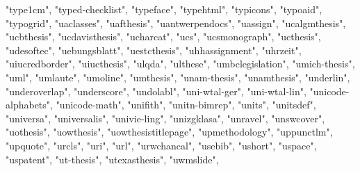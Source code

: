 \documentclass[
]{article}
\newenvironment{Shaded}{\begin{snugshade}}{\end{snugshade}}
\newcommand{\NormalTok}[1]{#1}
\newcommand{\StringTok}[1]{\textcolor[rgb]{0.31,0.60,0.02}{#1}}
\begin{document}
\begin{Shaded}
\begin{Highlighting}[]
\StringTok{"type1cm"}\NormalTok{, }\StringTok{"typed{-}checklist"}\NormalTok{, }\StringTok{"typeface"}\NormalTok{, }\StringTok{"typehtml"}\NormalTok{, }\StringTok{"typicons"}\NormalTok{, }
\StringTok{"typoaid"}\NormalTok{, }\StringTok{"typogrid"}\NormalTok{, }\StringTok{"uaclasses"}\NormalTok{, }\StringTok{"uafthesis"}\NormalTok{, }\StringTok{"uantwerpendocs"}\NormalTok{, }
\StringTok{"uassign"}\NormalTok{, }\StringTok{"ucalgmthesis"}\NormalTok{, }\StringTok{"ucbthesis"}\NormalTok{, }\StringTok{"ucdavisthesis"}\NormalTok{, }\StringTok{"ucharcat"}\NormalTok{, }
\StringTok{"ucs"}\NormalTok{, }\StringTok{"ucsmonograph"}\NormalTok{, }\StringTok{"ucthesis"}\NormalTok{, }\StringTok{"udesoftec"}\NormalTok{, }\StringTok{"uebungsblatt"}\NormalTok{, }
\StringTok{"uestcthesis"}\NormalTok{, }\StringTok{"uhhassignment"}\NormalTok{, }\StringTok{"uhrzeit"}\NormalTok{, }\StringTok{"uiucredborder"}\NormalTok{, }\StringTok{"uiucthesis"}\NormalTok{, }
\StringTok{"ulqda"}\NormalTok{, }\StringTok{"ulthese"}\NormalTok{, }\StringTok{"umbclegislation"}\NormalTok{, }\StringTok{"umich{-}thesis"}\NormalTok{, }\StringTok{"uml"}\NormalTok{, }
\StringTok{"umlaute"}\NormalTok{, }\StringTok{"umoline"}\NormalTok{, }\StringTok{"umthesis"}\NormalTok{, }\StringTok{"unam{-}thesis"}\NormalTok{, }\StringTok{"unamthesis"}\NormalTok{, }
\StringTok{"underlin"}\NormalTok{, }\StringTok{"underoverlap"}\NormalTok{, }\StringTok{"underscore"}\NormalTok{, }\StringTok{"undolabl"}\NormalTok{, }\StringTok{"uni{-}wtal{-}ger"}\NormalTok{, }
\StringTok{"uni{-}wtal{-}lin"}\NormalTok{, }\StringTok{"unicode{-}alphabets"}\NormalTok{, }\StringTok{"unicode{-}math"}\NormalTok{, }\StringTok{"unifith"}\NormalTok{, }
\StringTok{"unitn{-}bimrep"}\NormalTok{, }\StringTok{"units"}\NormalTok{, }\StringTok{"unitsdef"}\NormalTok{, }\StringTok{"universa"}\NormalTok{, }\StringTok{"universalis"}\NormalTok{, }
\StringTok{"univie{-}ling"}\NormalTok{, }\StringTok{"unizgklasa"}\NormalTok{, }\StringTok{"unravel"}\NormalTok{, }\StringTok{"unswcover"}\NormalTok{, }\StringTok{"uothesis"}\NormalTok{, }
\StringTok{"uowthesis"}\NormalTok{, }\StringTok{"uowthesistitlepage"}\NormalTok{, }\StringTok{"upmethodology"}\NormalTok{, }\StringTok{"uppunctlm"}\NormalTok{, }
\StringTok{"upquote"}\NormalTok{, }\StringTok{"urcls"}\NormalTok{, }\StringTok{"uri"}\NormalTok{, }\StringTok{"url"}\NormalTok{, }\StringTok{"urwchancal"}\NormalTok{, }\StringTok{"usebib"}\NormalTok{, }\StringTok{"ushort"}\NormalTok{, }
\StringTok{"uspace"}\NormalTok{, }\StringTok{"uspatent"}\NormalTok{, }\StringTok{"ut{-}thesis"}\NormalTok{, }\StringTok{"utexasthesis"}\NormalTok{, }\StringTok{"uwmslide"}\NormalTok{, }

\end{Highlighting}
\end{Shaded}
\end{document}

